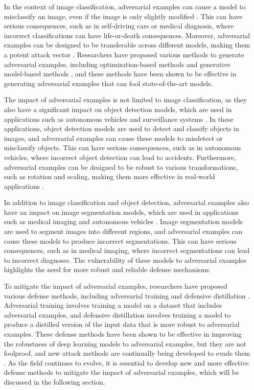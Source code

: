 \documentclass[11pt,a4paper]{article}
\begin{document}
In the context of image classification, adversarial examples can cause a model to misclassify an image, even if the image is only slightly modified \cite{doi:10.1201/9781351251389-8}. This can have serious consequences, such as in self-driving cars or medical diagnosis, where incorrect classifications can have life-or-death consequences. Moreover, adversarial examples can be designed to be transferable across different models, making them a potent attack vector \cite{doi:10.1109/cvpr.2019.00284}. Researchers have proposed various methods to generate adversarial examples, including optimization-based methods and generative model-based methods \cite{arxiv:1707.07397}, and these methods have been shown to be effective in generating adversarial examples that can fool state-of-the-art models.

The impact of adversarial examples is not limited to image classification, as they also have a significant impact on object detection models, which are used in applications such as autonomous vehicles and surveillance systems \cite{arxiv:1707.08945}. In these applications, object detection models are used to detect and classify objects in images, and adversarial examples can cause these models to misdetect or misclassify objects. This can have serious consequences, such as in autonomous vehicles, where incorrect object detection can lead to accidents. Furthermore, adversarial examples can be designed to be robust to various transformations, such as rotation and scaling, making them more effective in real-world applications \cite{doi:10.24963/ijcai.2019/134}.

In addition to image classification and object detection, adversarial examples also have an impact on image segmentation models, which are used in applications such as medical imaging and autonomous vehicles \cite{arxiv:1810.05162}. Image segmentation models are used to segment images into different regions, and adversarial examples can cause these models to produce incorrect segmentations. This can have serious consequences, such as in medical imaging, where incorrect segmentations can lead to incorrect diagnoses. The vulnerability of these models to adversarial examples highlights the need for more robust and reliable defense mechanisms.

To mitigate the impact of adversarial examples, researchers have proposed various defense methods, including adversarial training and defensive distillation \cite{doi:10.1145/3133956.3134057}. Adversarial training involves training a model on a dataset that includes adversarial examples, and defensive distillation involves training a model to produce a distilled version of the input data that is more robust to adversarial examples. These defense methods have been shown to be effective in improving the robustness of deep learning models to adversarial examples, but they are not foolproof, and new attack methods are continually being developed to evade them \cite{doi:10.1016/j.eng.2019.12.012}. As the field continues to evolve, it is essential to develop new and more effective defense methods to mitigate the impact of adversarial examples, which will be discussed in the following section.
\end{document}
